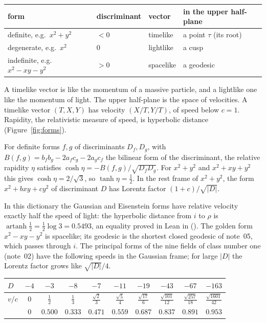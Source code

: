 \documentclass[11pt]{article}
\begin{document}
\begin{center}
\small
\begin{tabular}{@{}llll@{}}
\toprule
form & discriminant & vector & in the upper half-plane\\
\midrule
definite, e.g.\ $x^2+y^2$ & $<0$ & timelike & a point $\tau$ (its root)\\
degenerate, e.g.\ $x^2$ & $0$ & lightlike & a cusp\\
indefinite, e.g.\ $x^2-xy-y^2$ & $>0$ & spacelike & a geodesic\\
\bottomrule
\end{tabular}
\end{center}

\noindent
A timelike vector is like the momentum of a massive particle, and a lightlike one like the momentum of light.
The upper half-plane is the space of velocities.
A timelike vector $(T,X,Y)$ has velocity $(X/T,Y/T)$, of speed below $c=1$.
Rapidity, the relativistic measure of speed, is hyperbolic distance (Figure~\ref{fig:forms}).

\begin{derivation}\label{d:velocity}
For definite forms $f,g$ of discriminants $D_f,D_g$, with $B(f,g) = b_fb_g - 2a_fc_g - 2a_gc_f$ the bilinear form of the discriminant, the relative rapidity $\eta$ satisfies $\cosh\eta = -B(f,g)/\sqrt{D_fD_g}$.
For $x^2+y^2$ and $x^2+xy+y^2$ this gives $\cosh\eta = 2/\sqrt3$, so $\tanh\eta = \tfrac12$.
In the rest frame of $x^2+y^2$, the form $x^2+bxy+cy^2$ of discriminant $D$ has Lorentz factor $(1+c)/\sqrt{|D|}$.
\end{derivation}

\physical
In this dictionary the Gaussian and Eisenstein forms have relative velocity exactly half the speed of light: the hyperbolic distance from $i$ to $\rho$ is $\operatorname{artanh}\frac12 = \frac12\log3 = 0.5493$, an equality proved in Lean in \formal{} ().
The golden form $x^2-xy-y^2$ is spacelike; its geodesic is the shortest closed geodesic of note~05, which passes through $i$.
The principal forms of the nine fields of class number one (note~02) have the following speeds in the Gaussian frame; for large $|D|$ the Lorentz factor grows like $\sqrt{|D|}/4$.

\begin{center}
\small
\begin{tabular}{@{}lccccccccc@{}}
\toprule
$D$ & $-4$ & $-3$ & $-8$ & $-7$ & $-11$ & $-19$ & $-43$ & $-67$ & $-163$\\
\midrule
$v/c$ & $0$ & $\frac12$ & $\frac13$ & $\frac{\sqrt2}{3}$ & $\frac{\sqrt5}{4}$ & $\frac{\sqrt{17}}{6}$ & $\frac{\sqrt{101}}{12}$ & $\frac{\sqrt{257}}{18}$ & $\frac{\sqrt{1601}}{42}$\\
 & $0$ & $0.500$ & $0.333$ & $0.471$ & $0.559$ & $0.687$ & $0.837$ & $0.891$ & $0.953$\\
\bottomrule
\end{tabular}
\end{center}
\end{document}
